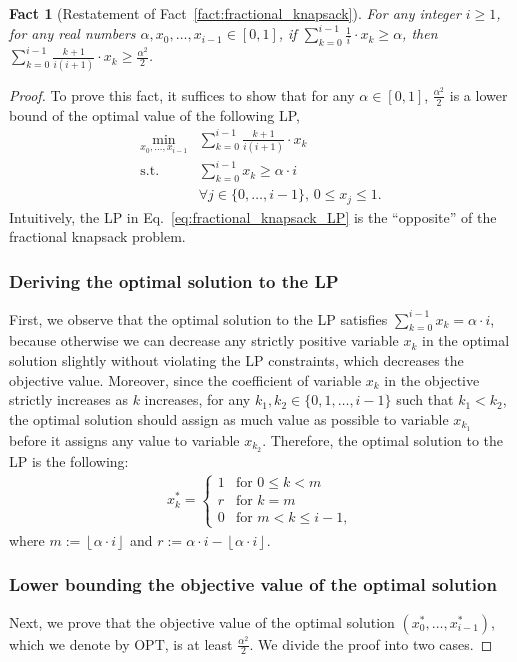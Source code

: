 \documentclass[11pt]{article}
\newcommand{\floor}[1]{\left\lfloor #1 \right\rfloor}
\newtheorem{fact}[theorem]{Fact}
\begin{document}
\begin{fact}[Restatement of Fact~\ref{fact:fractional_knapsack}]
For any integer $i\ge1$, for any real numbers $\alpha,x_0,\dots,x_{i-1}\in[0,1]$, if $\sum_{k=0}^{i-1}\frac{1}{i}\cdot x_{k}\ge\alpha$, then $\sum_{k=0}^{i-1} \frac{k+1}{i(i+1)}\cdot x_{k}\ge\frac{\alpha^2}{2}$.
\end{fact}
\begin{proof}
To prove this fact, it suffices to show that for any $\alpha\in[0,1]$, $\frac{\alpha^2}{2}$ is a lower bound of the optimal value of the following LP,
\begin{align}\label{eq:fractional_knapsack_LP}
    \min_{x_0,\dots,x_{i-1}}& \sum_{k=0}^{i-1} \frac{k+1}{i(i+1)}\cdot x_{k}\nonumber\\
    \textrm{s.t. }& \sum_{k=0}^{i-1} x_{k}\ge\alpha\cdot i\nonumber\\
    & \forall j\in\{0,\dots,i-1\},\,0\le x_j\le 1.
\end{align}
Intuitively, the LP in Eq.~\eqref{eq:fractional_knapsack_LP} is the ``opposite'' of the fractional knapsack problem.
\subsubsection*{Deriving the optimal solution to the LP}
First, we observe that the optimal solution to the LP satisfies $\sum_{k=0}^{i-1} x_{k}=\alpha\cdot i$, because otherwise we can decrease any strictly positive variable $x_k$ in the optimal solution slightly without violating the LP constraints, which decreases the objective value. Moreover, since the coefficient of variable $x_k$ in the objective strictly increases as $k$ increases, for any $k_1,k_2\in\{0,1,\dots,i-1\}$ such that $k_1<k_2$, the optimal solution should assign as much value as possible to variable $x_{k_1}$ before it assigns any value to variable $x_{k_2}$. Therefore, the optimal solution to the LP is the following:
\begin{align}\label{eq:fractional_knapsack_optimal_solution}
x_k^*=
    \begin{cases}
        1 &\textrm{for } 0\le k<m\\
        r &\textrm{for } k = m\\
        0 &\textrm{for } m< k\le i-1,
    \end{cases}
\end{align}
where $m:=\floor{\alpha\cdot i}$ and $r:=\alpha\cdot i-\floor{\alpha\cdot i}$.
\subsubsection*{Lower bounding the objective value of the optimal solution}
Next, we prove that the objective value of the optimal solution $(x^*_0,\dots,x^*_{i-1})$, which we denote by $\textrm{OPT}$, is at least $\frac{\alpha^2}{2}$. We divide the proof into two cases.

\end{proof}
\end{document}
